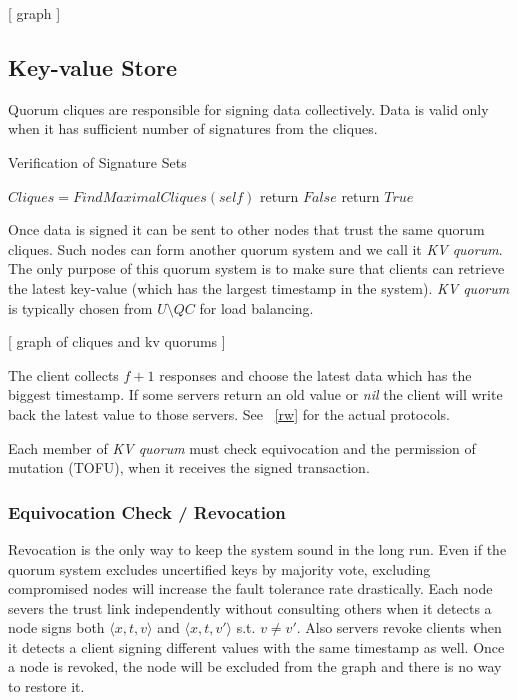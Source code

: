 \documentclass[twoside,twocolumn,10pt,fleqn]{article}
\begin{document}
[ graph ]

\subsection{Key-value Store}
Quorum cliques are responsible for signing data collectively. Data is
valid only when it has sufficient number of signatures from the
cliques. 

\begin{algorithm}
  \caption{Verification of Signature Sets}
  \SetAlgoNoLine
  $Cliques = FindMaximalCliques(self)$\;
  {
    {
      return $False$\;
    }
  }
  return $True$\;
\end{algorithm}

Once data is signed it can be sent to other nodes that trust the same
quorum cliques. Such nodes can form another quorum system and we call
it {\em KV quorum}. The only purpose of this quorum system is to make
sure that clients can retrieve the latest key-value (which has the
largest timestamp in the system). {\em KV quorum} is typically chosen
from $U \setminus QC$ for load balancing.

[ graph of cliques and kv quorums ]

The client collects $f + 1$ responses and choose the latest data which
has the biggest timestamp. If some servers return an old value or {\em
  nil} the client will write back the latest value to those
servers. See ~\ref{rw} for the actual protocols.

Each member of {\em KV quorum} must check equivocation and the
permission of mutation (TOFU), when it receives the signed
transaction.

\subsubsection*{Equivocation Check / Revocation}
Revocation is the only way to keep the system sound in the long
run. Even if the quorum system excludes uncertified keys by majority
vote, excluding compromised nodes will increase the fault tolerance
rate drastically.
Each node severs the trust link independently without consulting
others when it detects a node signs both $\langle x,t,v \rangle$ and
$\langle x,t,v' \rangle$ s.t.  $v \neq v'$. Also servers revoke
clients when it detects a client signing different values with the
same timestamp as well. Once a node is revoked, the node will be
excluded from the graph and there is no way to restore it.
\end{document}
